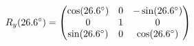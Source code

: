 \documentclass[preview]{standalone}
\begin{document}
\begin{align*}
\special{dvisvgm:raw <g id='unique000'>}R_y(26.6^\circ) = \begin{pmatrix} \cos(26.6^\circ) & 0 & -\sin(26.6^\circ) \\ 0 & 1 & 0 \\ \sin(26.6^\circ) & 0 & \cos(26.6^\circ) \end{pmatrix}\special{dvisvgm:raw </g>}
\end{align*}
\end{document}
